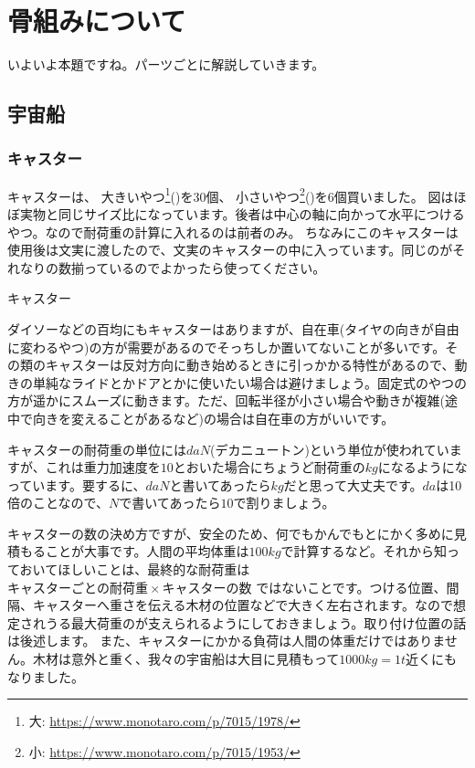 \documentclass[uplatex,dvipdfmx]{jsreport}
\begin{document}
\chapter{骨組みについて}

いよいよ本題ですね。パーツごとに解説していきます。

\section{宇宙船}
\subsection{キャスター}

キャスターは、
大きいやつ\footnote{大: \url{https://www.monotaro.com/p/7015/1978/}}()を30個、
小さいやつ\footnote{小: \url{https://www.monotaro.com/p/7015/1953/}}()を6個買いました。
図はほぼ実物と同じサイズ比になっています。後者は中心の軸に向かって水平につけるやつ。なので耐荷重の計算に入れるのは前者のみ。
ちなみにこのキャスターは使用後は文実に渡したので、文実のキャスターの中に入っています。同じのがそれなりの数揃っているのでよかったら使ってください。

\begin{imageHere}{キャスター}
\end{imageHere}

ダイソーなどの百均にもキャスターはありますが、自在車(タイヤの向きが自由に変わるやつ)の方が需要があるのでそっちしか置いてないことが多いです。その類のキャスターは反対方向に動き始めるときに引っかかる特性があるので、動きの単純なライドとかドアとかに使いたい場合は避けましょう。固定式のやつの方が遥かにスムーズに動きます。ただ、回転半径が小さい場合や動きが複雑(途中で向きを変えることがあるなど)の場合は自在車の方がいいです。

キャスターの耐荷重の単位には$\si{daN}$(デカニュートン)という単位が使われていますが、これは重力加速度を$10$とおいた場合にちょうど耐荷重の$\si{kg}$になるようになっています。要するに、$\si{daN}$と書いてあったら$\si{kg}$だと思って大丈夫です。$\si{da}$は10倍のことなので、$\si{N}$で書いてあったら$10$で割りましょう。

キャスターの数の決め方ですが、安全のため、何でもかんでもとにかく多めに見積もることが大事です。人間の平均体重は$100\si{kg}$で計算するなど。それから知っておいてほしいことは、最終的な耐荷重は $キャスターごとの耐荷重\times{}キャスターの数$ ではないことです。つける位置、間隔、キャスターへ重さを伝える木材の位置などで大きく左右されます。なので想定されうる最大荷重のが支えられるようにしておきましょう。取り付け位置の話は後述します。
また、キャスターにかかる負荷は人間の体重だけではありません。木材は意外と重く、我々の宇宙船は大目に見積もって$1000\si{kg} = 1\si{t}$近くにもなりました。
\end{document}
